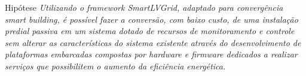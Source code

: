 \begin{frame}{Hipótese}
\textit{Utilizando o framework SmartLVGrid, adaptado para convergência smart building, é
possível fazer a conversão, com baixo custo, de uma instalação predial passiva em um sistema
dotado de recursos de monitoramento e controle sem alterar as características do sistema existente
através do desenvolvimento de plataformas embarcadas compostas por hardware e firmware
dedicados a realizar serviços que possibilitem o aumento da eficiência energética. }
\end{frame}

